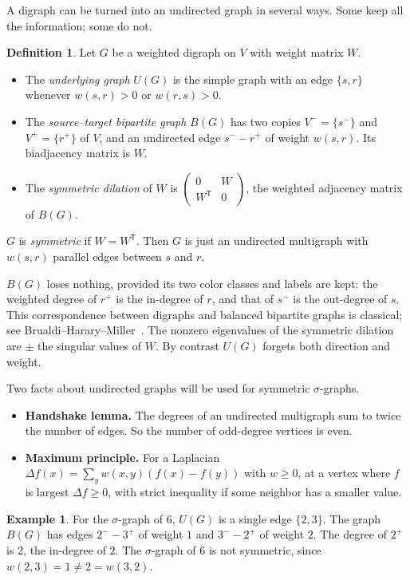 \documentclass[11pt]{article}
\theoremstyle{definition}
\newtheorem{definition}[theorem]{Definition}
\newtheorem{example}[theorem]{Example}
\theoremstyle{remark}
\begin{document}
A digraph can be turned into an undirected graph in several ways.  Some keep
all the information; some do not.

\begin{definition}
Let $G$ be a weighted digraph on $V$ with weight matrix $W$.
\begin{itemize}[leftmargin=1.5em]
\item The \emph{underlying graph} $U(G)$ is the simple graph with an edge
  $\{s,r\}$ whenever $w(s,r)>0$ or $w(r,s)>0$.
\item The \emph{source--target bipartite graph} $B(G)$ has two copies
  $V^-=\{s^-\}$ and $V^+=\{r^+\}$ of $V$, and an undirected edge
  $s^-\!-\!r^+$ of weight $w(s,r)$.  Its biadjacency matrix is $W$.
\item The \emph{symmetric dilation} of $W$ is
  $\begin{pmatrix}0&W\\W^{\mathsf T}&0\end{pmatrix}$, the weighted
  adjacency matrix of $B(G)$.
\end{itemize}
$G$ is \emph{symmetric} if $W=W^{\mathsf T}$.  Then $G$ is just an
undirected multigraph with $w(s,r)$ parallel edges between $s$ and $r$.
\end{definition}

$B(G)$ loses nothing, provided its two color classes and labels are kept:
the weighted degree of $r^+$ is the in-degree of $r$, and that of $s^-$ is
the out-degree of $s$.  This correspondence between digraphs and balanced
bipartite graphs is classical; see
Brualdi--Harary--Miller~\cite{BrualdiHararyMiller}.  The nonzero eigenvalues
of the symmetric dilation are $\pm$ the singular values of $W$.  By contrast
$U(G)$ forgets both direction and weight.

Two facts about undirected graphs will be used for symmetric $\sigma$-graphs.
\begin{itemize}[leftmargin=1.5em]
\item \textbf{Handshake lemma.}  The degrees of an undirected multigraph sum
  to twice the number of edges.  So the number of odd-degree vertices is
  even.
\item \textbf{Maximum principle.}  For a Laplacian
  $\Delta f(x)=\sum_y w(x,y)(f(x)-f(y))$ with $w\ge0$, at a vertex where $f$
  is largest $\Delta f\ge0$, with strict inequality if some neighbor has a
  smaller value.
\end{itemize}

\begin{example}
For the $\sigma$-graph of $6$, $U(G)$ is a single edge $\{2,3\}$.  The graph
$B(G)$ has edges $2^-\!-\!3^+$ of weight $1$ and $3^-\!-\!2^+$ of weight
$2$.  The degree of $2^+$ is $2$, the in-degree of $2$.  The $\sigma$-graph of
$6$ is not symmetric, since $w(2,3)=1\ne2=w(3,2)$.
\end{example}
\end{document}
